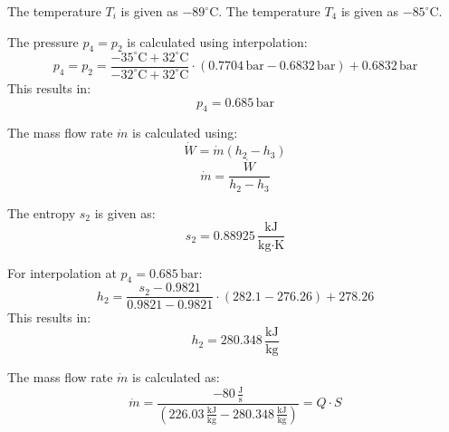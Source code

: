 The temperature \( T_i \) is given as \( -89^\circ\text{C} \).  
The temperature \( T_4 \) is given as \( -85^\circ\text{C} \).  

The pressure \( p_4 = p_2 \) is calculated using interpolation:  
\[
p_4 = p_2 = \frac{-35^\circ\text{C} + 32^\circ\text{C}}{-32^\circ\text{C} + 32^\circ\text{C}} \cdot (0.7704 \, \text{bar} - 0.6832 \, \text{bar}) + 0.6832 \, \text{bar}
\]  
This results in:  
\[
p_4 = 0.685 \, \text{bar}
\]

The mass flow rate \( \dot{m} \) is calculated using:  
\[
\dot{W} = \dot{m} (h_2 - h_3)
\]  
\[
\dot{m} = \frac{\dot{W}}{h_2 - h_3}
\]

The entropy \( s_2 \) is given as:  
\[
s_2 = 0.88925 \, \frac{\text{kJ}}{\text{kg·K}}
\]

For interpolation at \( p_4 = 0.685 \, \text{bar} \):  
\[
h_2 = \frac{s_2 - 0.9821}{0.9821 - 0.9821} \cdot (282.1 - 276.26) + 278.26
\]  
This results in:  
\[
h_2 = 280.348 \, \frac{\text{kJ}}{\text{kg}}
\]

The mass flow rate \( \dot{m} \) is calculated as:  
\[
\dot{m} = \frac{-80 \, \frac{\text{J}}{\text{s}}}{(226.03 \, \frac{\text{kJ}}{\text{kg}} - 280.348 \, \frac{\text{kJ}}{\text{kg}})} = Q \cdot S
\]